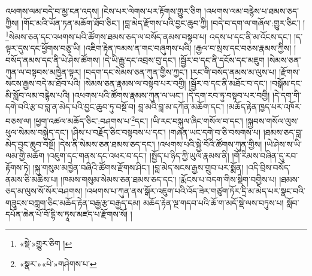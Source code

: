 འཕགས་ལམ་བདེ་བ་མྱ་ངན་འདས། །ངེས་པར་ལེགས་པར་རྟོགས་གྱུར་ཅིག །འཕགས་ལམ་བརྙེས་པ་ཐམས་ཅད་ཀྱིས། །གོང་མའི་ཡོན་ཏན་མཆོག་ཐོབ་ཅིང་། །བླ་མེད་རྫོགས་པའི་བྱང་ཆུབ་ཀྱི། །བདེ་བ་དག་ལ་གཞོལ་:གྱུར་ཅིང་། །\footnote{«སྡེ་»གྱུར་ཅིག །}སེམས་ཅན་དང་འཕགས་པའི་ཚོགས་ཐམས་ཅད་ལ་བསོད་ནམས་བསྟབ་པ། འདས་པ་དང་ནི་མ་འོངས་དང་། །ད་ལྟར་དུས་དང་ཕྱོགས་བཅུ་ཡི། །འཇིག་རྟེན་ཁམས་ན་གང་བཞུགས་པའི། །རྒྱལ་བ་སྲས་དང་བཅས་རྣམས་ཀྱིས། །བསོད་ནམས་དང་ནི་ཡེ་ཤེས་ཚོགས། །དེ་ཡི་རྒྱུ་དང་འབྲས་བུ་དང་། །སྦྱོར་བ་དང་ནི་དངོས་དང་མཇུག །སེམས་ཅན་ཀུན་ལ་བསྟབས་མཁྱེན་ལྟར། །བདག་དང་སེམས་ཅན་ཀུན་གྱིས་ཀྱང་། །རང་གི་བསོད་ནམས་མ་ལུས་པ། །རྫོགས་སངས་རྒྱས་བདེ་མ་ཐོབ་པའི། །སེམས་ཅན་རྣམས་ལ་བསྟབ་པར་བགྱི། །སྦྱོར་བ་དང་ནི་མཐོང་བ་དང་། །བསྒོམ་དང་མི་སློབ་ལམ་བརྙེས་པའི། །འཕགས་པའི་ཚོགས་རྣམས་ཀུན་ལ་ཡང་། །དེ་དག་རབ་ཏུ་བསྟབ་པར་བགྱི། །དེ་དག་གི་དགེ་བའི་རྩ་བ་བླ་ན་མེད་པའི་བྱང་ཆུབ་ཏུ་བསྔོ་བ། བླ་མའི་བླ་མ་དཀོན་མཆོག་དང་། །མཆོད་རྟེན་ཁྱད་པར་འཁོར་བཅས་ལ། །ཕྱག་འཚལ་མཆོད་ཅིང་:བཤགས་པ་\footnote{«སྣར་»«པེ་»གཤེགས་པ་}དང་། །ཡི་རང་བསྐུལ་ཞིང་གསོལ་བ་དང་། །སྐྱབས་གསོལ་ལུས་ཕུལ་སེམས་བསྐྱེད་དང་། །ཤིས་པ་བརྗོད་ཅིང་བསྟབས་པ་དང་། །གཞན་ཡང་དགེ་བ་ཅི་བསགས་པ། །ཐམས་ཅད་བླ་མེད་བྱང་ཆུབ་བསྔོ། །དེས་ནི་སེམས་ཅན་ཐམས་ཅད་དང་། །འཕགས་པའི་སྐྱེ་བོའི་ཚོགས་ཀུན་གྱིས། །ཡེ་ཤེས་ས་ཡི་ལམ་གྱི་མཆོག །འཇུག་དང་གནས་དང་འཕར་བ་དང་། །སྤྱོད་པ་ཉིད་ཀྱི་ཡུལ་རྣམས་ནི། །གོ་རིམས་བཞིན་དུ་རབ་རྟོགས་ཏེ། །སྐུ་གསུམ་མཁྱེན་བཞིའི་ཚོགས་རྫོགས་ཤིང་། །བླ་མེད་སངས་རྒྱས་གྲུབ་པར་སྨོན། །འདི་བྲིས་བསོད་ནམས་ཅི་མཆིས་པ། །ཁམས་གསུམ་སེམས་ཅན་ཐམས་ཅད་དང་། །རྨོངས་པ་བདག་གིས་སྡིག་བགྱིས་པ། །ཐམས་ཅད་མ་ལུས་སོ་སོར་བཤགས། །འཕགས་པ་ཀུན་ནས་སྒོར་འཇུག་པའི་འོད་ཟེར་གཙུག་ཏོར་དྲི་མ་མེད་པར་སྣང་བའི་གཟུངས་བཀླག་ཅིང་མཆོད་རྟེན་བརྒྱ་རྩ་བརྒྱད་དམ། མཆོད་རྟེན་ལྔ་གདབ་པའི་ཆོ་ག་མདོ་སྡེ་ལས་བཏུས་པ། སློབ་དཔོན་ཆེན་པོ་བོ་དྷི་ས་ཏཱས་མཛད་པ་རྫོགས་སོ། ། 